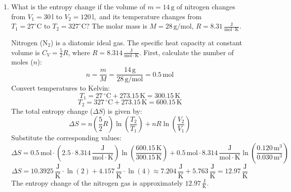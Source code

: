 \documentclass[12pt]{letter}
\begin{document}
\begin{enumerate}
\hfill (10~points)


\bigskip
\item  What is the entropy change if the volume of $ m = 14\,\mathrm{g} $ of nitrogen changes from $ V_1 = 30\,\mathrm{l} \text{\ to\ } V_2 = 120\,\mathrm{l},$ and its temperature changes from $T_1 = 27^\circ\mathrm{C} \text{\ to\ } T_2 = 327^\circ\mathrm{C}?$ The molar mass is $ M = 28\,\mathrm{g/mol}$, $R=8.31\,\mathrm{\frac{J}{mol\cdot K}}$.

\bigskip

\begin{center}
\end{center}

Nitrogen ($\mathrm{N_2}$) is a diatomic ideal gas. The specific heat capacity at constant volume is $C_V = \frac{5}{2}R$, where $R = 8.314\,\mathrm{\frac{J}{mol \cdot K}}$.
First, calculate the number of moles ($n$):
$$n = \frac{m}{M} = \frac{14\,\mathrm{g}}{28\,\mathrm{g/mol}} = 0.5\,\mathrm{mol}$$
Convert temperatures to Kelvin:
$$T_1 = 27\,\mathrm{{}^{\circ}C} + 273.15\,\mathrm{K} = 300.15\,\mathrm{K}$$
$$T_2 = 327\,\mathrm{{}^{\circ}C} + 273.15\,\mathrm{K} = 600.15\,\mathrm{K}$$
The total entropy change ($\Delta S$) is given by:
$$\Delta S = n \left(\frac{5}{2}R\right) \ln\left(\frac{T_2}{T_1}\right) + n R \ln\left(\frac{V_2}{V_1}\right)$$
Substitute the corresponding values:
$$\Delta S = 0.5\,\mathrm{mol} \cdot \left(2.5 \cdot 8.314\,\mathrm{\frac{J}{mol \cdot K}}\right) \ln\left(\frac{600.15\,\mathrm{K}}{300.15\,\mathrm{K}}\right) + 0.5\,\mathrm{mol} \cdot 8.314\,\mathrm{\frac{J}{mol \cdot K}} \ln\left(\frac{0.120\,\mathrm{m^{3}}}{0.030\,\mathrm{m^3}}\right)$$
$$\Delta S = 10.3925\,\mathrm{\frac{J}{K}} \cdot \ln(2) + 4.157\,\mathrm{\frac{J}{K}} \cdot \ln(4) \approx 7.204\,\mathrm{\frac{J}{K}} + 5.763\,\mathrm{\frac{J}{K}} = 12.97\,\mathrm{\frac{J}{K}}$$
The entropy change of the nitrogen gas is approximately $12.97\,\mathrm{\frac{J}{K}}$.


\end{enumerate}
\end{document}
